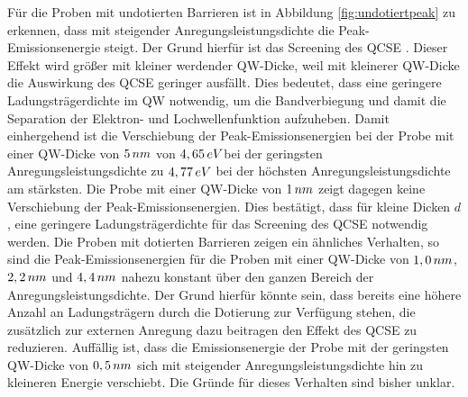 \noindent 
Für die Proben mit undotierten Barrieren ist in Abbildung \ref{fig:undotiertpeak} zu erkennen, dass mit steigender Anregungsleistungsdichte die Peak-Emissionsenergie steigt. Der Grund hierfür ist das Screening des QCSE \cite{doi:10.1063/1.1763211}. Dieser Effekt wird größer mit kleiner werdender QW-Dicke, weil mit kleinerer QW-Dicke die Auswirkung des QCSE geringer ausfällt. Dies bedeutet, dass eine geringere Ladungsträgerdichte im QW notwendig, um die Bandverbiegung und damit die Separation der Elektron- und Lochwellenfunktion aufzuheben. 
\newline
Damit einhergehend ist die Verschiebung der Peak-Emissionsenergien bei der Probe mit einer QW-Dicke von $5 \thinspace nm$ von $4,65 \thinspace eV$bei der geringsten Anregungsleistungsdichte zu $4,77 \thinspace eV$ bei der höchsten Anregungsleistungsdichte am stärksten. 
\newline 
Die Probe mit einer QW-Dicke von $1 \thinspace nm$ zeigt dagegen keine Verschiebung der Peak-Emissionsenergien. Dies bestätigt, dass für kleine Dicken $d$, eine geringere Ladungsträgerdichte für das Screening des QCSE notwendig werden.
\newline
Die Proben mit dotierten Barrieren zeigen ein ähnliches Verhalten, so sind die Peak-Emissionsenergien für die Proben mit einer QW-Dicke von 
$1,0 \thinspace nm$, $2,2 \thinspace nm$ und $4,4 \thinspace nm$ nahezu konstant über den ganzen Bereich der Anregungsleistungsdichte.
Der Grund hierfür könnte sein, dass bereits eine höhere Anzahl an Ladungsträgern durch die Dotierung zur Verfügung stehen, die zusätzlich zur  externen Anregung dazu beitragen den Effekt des QCSE zu reduzieren.
\newline
Auffällig ist, dass die Emissionsenergie der Probe mit der geringsten QW-Dicke von $0,5 \thinspace nm$ sich mit steigender Anregungsleistungsdichte hin zu kleineren Energie verschiebt. Die Gründe für dieses Verhalten sind bisher unklar.
